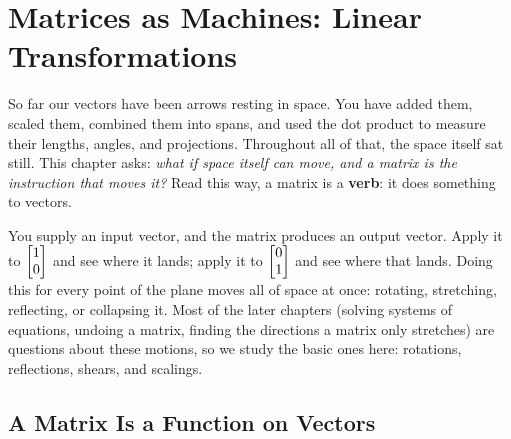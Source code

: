 \chapter{Matrices as Machines: Linear Transformations}

So far our vectors have been arrows resting in space. You have added
them, scaled them, combined them into spans, and used the dot product to measure
their lengths, angles, and projections. Throughout all of that, the space
itself sat still. This chapter asks: \emph{what if space itself can move, and a
matrix is the instruction that moves it?} Read this way, a matrix is a
\textbf{verb}: it does something to vectors.

You supply an input vector, and the matrix produces an output vector. Apply it to
$\begin{bmatrix}1\\0\end{bmatrix}$ and see where it lands; apply it to $\begin{bmatrix}0\\1\end{bmatrix}$ and see where
that lands. Doing this for every point of the plane moves all of space at once:
rotating, stretching, reflecting, or collapsing it. Most of the later chapters
(solving systems of equations, undoing a matrix, finding the directions a matrix
only stretches) are questions about these motions, so we study the basic ones
here: rotations, reflections, shears, and scalings.

\section{A Matrix Is a Function on Vectors}
\label{ch05:matrix-is-function}


